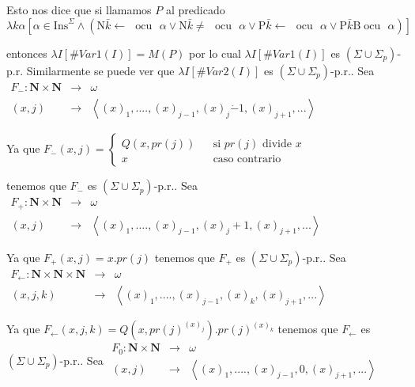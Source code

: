 Esto nos dice que si llamamos \(P\) al predicado
\(\displaystyle \lambda k\alpha \left[ \alpha \in \mathrm{Ins}^{\Sigma }\wedge (\mathrm{N} \bar{k}\mathrm{\leftarrow }\text{ }\mathrm{ocu}\text{ }\alpha \vee \mathrm{N} \bar{k}\mathrm{\neq }\text{ }\mathrm{ocu}\text{ }\alpha \vee \mathrm{P}\bar{k }\mathrm{\leftarrow }\text{ }\mathrm{ocu}\text{ }\alpha \vee \mathrm{P}\bar{k }\mathrm{B}\;\mathrm{ocu}\text{ }\alpha )\right] \)

entonces \(\lambda I[\#Var1(I)]=M(P)\) por lo cual \(\lambda I[\#Var1(I)]\) es \( (\Sigma \cup \Sigma _{p})\)-p.r. Similarmente se puede ver que \(\lambda I[\#Var2(I)]\) es \((\Sigma \cup \Sigma _{p})\)-p.r.. Sea
\(\displaystyle \begin{array}{rll} F_{\dot{-}}:\mathbf{N}\times \mathbf{N} & \rightarrow & \omega \\ (x,j) & \rightarrow & \left\langle (x)_{1},....,(x)_{j-1},(x)_{j}\dot{-} 1,(x)_{j+1},...\right\rangle \end{array} \)

Ya que
\(\displaystyle F_{\dot{-}}(x,j)=\left\{ \begin{array}{lll} Q(x,pr(j)) & & \text{si }pr(j)\text{ divide }x \\ x & & \text{caso contrario} \end{array} \right. \)

tenemos que \(F_{\dot{-}}\) es \((\Sigma \cup \Sigma _{p})\)-p.r.. Sea
\(\displaystyle \begin{array}{rll} F_{+}:\mathbf{N}\times \mathbf{N} & \rightarrow & \omega \\ (x,j) & \rightarrow & \left\langle (x)_{1},....,(x)_{j-1},(x)_{j}+1,(x)_{j+1},...\right\rangle \end{array} \)

Ya que \(F_{+}(x,j)=x.pr(j)\) tenemos que \(F_{+}\) es \((\Sigma \cup \Sigma _{p}) \)-p.r.. Sea
\(\displaystyle \begin{array}{rll} F_{\leftarrow }:\mathbf{N}\times \mathbf{N}\times \mathbf{N} & \rightarrow & \omega \\ (x,j,k) & \rightarrow & \left\langle (x)_{1},....,(x)_{j-1},(x)_{k},(x)_{j+1},...\right\rangle \end{array} \)

Ya que \(F_{\leftarrow }(x,j,k)=Q(x,pr(j)^{(x)_{j}}).pr(j)^{(x)_{k}}\) tenemos que \(F_{\leftarrow }\) es \((\Sigma \cup \Sigma _{p})\)-p.r.. Sea
\(\displaystyle \begin{array}{rll} F_{0}:\mathbf{N}\times \mathbf{N} & \rightarrow & \omega \\ (x,j) & \rightarrow & \left\langle (x)_{1},....,(x)_{j-1},0,(x)_{j+1},...\right\rangle \end{array} \)

